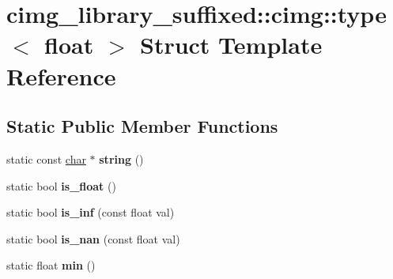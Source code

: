 \hypertarget{structcimg__library__suffixed_1_1cimg_1_1type_3_01float_01_4}{}\section{cimg\+\_\+library\+\_\+suffixed\+:\+:cimg\+:\+:type$<$ float $>$ Struct Template Reference}
\label{structcimg__library__suffixed_1_1cimg_1_1type_3_01float_01_4}
\subsection*{Static Public Member Functions}
\begin{DoxyCompactItemize}
\item 
\mbox{\label{structcimg__library__suffixed_1_1cimg_1_1type_3_01float_01_4_a2699ebb9cf2957508f337e3f2d63850e}} 
static const \hyperlink{classchar}{char} $\ast$ {\bfseries string} ()
\item 
\mbox{\label{structcimg__library__suffixed_1_1cimg_1_1type_3_01float_01_4_a4401985fec5266f7c8ed43aa396b9b3d}} 
static bool {\bfseries is\+\_\+float} ()
\item 
\mbox{\label{structcimg__library__suffixed_1_1cimg_1_1type_3_01float_01_4_aa2f6aa9ed1a9bf37f1bd44378324fe41}} 
static bool {\bfseries is\+\_\+inf} (const float val)
\item 
\mbox{\label{structcimg__library__suffixed_1_1cimg_1_1type_3_01float_01_4_a18d1f73104c91355fbeb46be658e757c}} 
static bool {\bfseries is\+\_\+nan} (const float val)
\item 
\mbox{\label{structcimg__library__suffixed_1_1cimg_1_1type_3_01float_01_4_aafc9f845ace5ac24cabff68dea6d463d}} 
static float {\bfseries min} ()
\item 
\mbox{\label{structcimg__library__suffixed_1_1cimg_1_1type_3_01float_01_4_a336b85133723c583a10727b8ddea5f74}} 

\end{DoxyCompactItemize}
